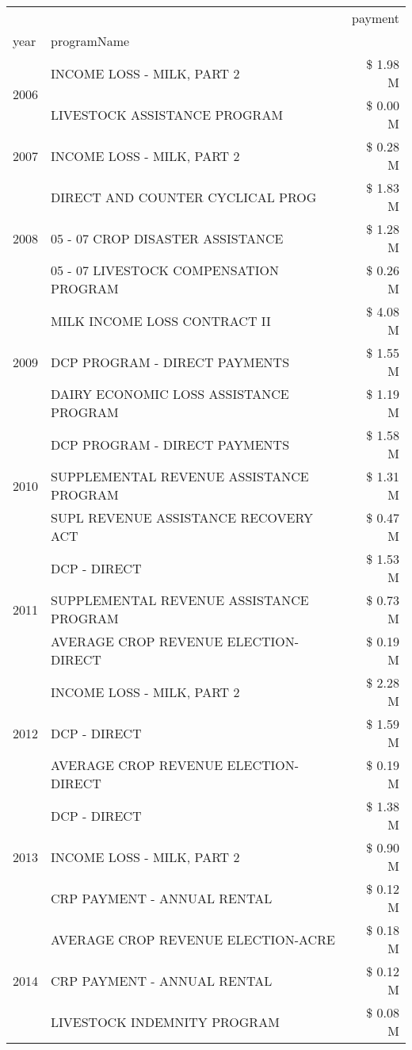 \begin{tabular}{llr}
\toprule
 &  & payment \\
year & programName &  \\
\midrule
\multirow[t]{2}{*}{2006} & INCOME LOSS - MILK, PART 2 & \$ 1.98 M \\
 & LIVESTOCK ASSISTANCE PROGRAM & \$ 0.00 M \\
\cline{1-3}
2007 & INCOME LOSS - MILK, PART 2 & \$ 0.28 M \\
\cline{1-3}
\multirow[t]{3}{*}{2008} & DIRECT AND COUNTER CYCLICAL PROG & \$ 1.83 M \\
 & 05 - 07 CROP DISASTER ASSISTANCE & \$ 1.28 M \\
 & 05 - 07 LIVESTOCK COMPENSATION PROGRAM & \$ 0.26 M \\
\cline{1-3}
\multirow[t]{3}{*}{2009} & MILK INCOME LOSS CONTRACT II & \$ 4.08 M \\
 & DCP PROGRAM - DIRECT PAYMENTS & \$ 1.55 M \\
 & DAIRY ECONOMIC LOSS ASSISTANCE PROGRAM & \$ 1.19 M \\
\cline{1-3}
\multirow[t]{3}{*}{2010} & DCP PROGRAM - DIRECT PAYMENTS & \$ 1.58 M \\
 & SUPPLEMENTAL REVENUE ASSISTANCE PROGRAM & \$ 1.31 M \\
 & SUPL REVENUE ASSISTANCE RECOVERY ACT & \$ 0.47 M \\
\cline{1-3}
\multirow[t]{3}{*}{2011} & DCP - DIRECT & \$ 1.53 M \\
 & SUPPLEMENTAL REVENUE ASSISTANCE PROGRAM & \$ 0.73 M \\
 & AVERAGE CROP REVENUE ELECTION-DIRECT & \$ 0.19 M \\
\cline{1-3}
\multirow[t]{3}{*}{2012} & INCOME LOSS - MILK, PART 2 & \$ 2.28 M \\
 & DCP - DIRECT & \$ 1.59 M \\
 & AVERAGE CROP REVENUE ELECTION-DIRECT & \$ 0.19 M \\
\cline{1-3}
\multirow[t]{3}{*}{2013} & DCP - DIRECT & \$ 1.38 M \\
 & INCOME LOSS - MILK, PART 2 & \$ 0.90 M \\
 & CRP PAYMENT - ANNUAL RENTAL & \$ 0.12 M \\
\cline{1-3}
\multirow[t]{3}{*}{2014} & AVERAGE CROP REVENUE ELECTION-ACRE & \$ 0.18 M \\
 & CRP PAYMENT - ANNUAL RENTAL & \$ 0.12 M \\
 & LIVESTOCK INDEMNITY PROGRAM & \$ 0.08 M \\

\end{tabular}
